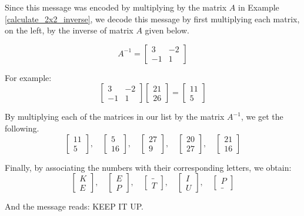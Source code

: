 \begin{solution}
    Since this message was encoded by multiplying by the matrix \( A \) in Example \ref{calculate_2x2_inverse}, we decode this message by first multiplying each matrix, on the left, by the inverse of matrix \( A \) given below.

    \[ A^{-1} = \begin{bmatrix} 3 & -2 \\ -1 & 1 \end{bmatrix} \]

    For example:
    \[ \begin{bmatrix} 3 & -2 \\ -1 & 1 \end{bmatrix} \begin{bmatrix} 21 \\ 26 \end{bmatrix} = \begin{bmatrix} 11 \\ 5 \end{bmatrix} \]

    By multiplying each of the matrices in our list by the matrix \( A^{-1} \), we get the following.
    \[ \begin{bmatrix} 11 \\ 5 \end{bmatrix}, \quad\begin{bmatrix}  5 \\ 16 \end{bmatrix}, \quad \begin{bmatrix} 27 \\ 9 \end{bmatrix}, \quad\begin{bmatrix} 20 \\ 27 \end{bmatrix}, \quad \begin{bmatrix} 21 \\ 16 \end{bmatrix} \]

    Finally, by associating the numbers with their corresponding letters, we obtain:
    \[ \begin{bmatrix} K \\ E \end{bmatrix}, \quad\begin{bmatrix} E \\ P \end{bmatrix}, \quad \begin{bmatrix} \_ \\ T \end{bmatrix}, \quad\begin{bmatrix} I \\ U \end{bmatrix}, \quad \begin{bmatrix} P \\ \_ \end{bmatrix} \]

    And the message reads: KEEP IT UP.
\end{solution}


